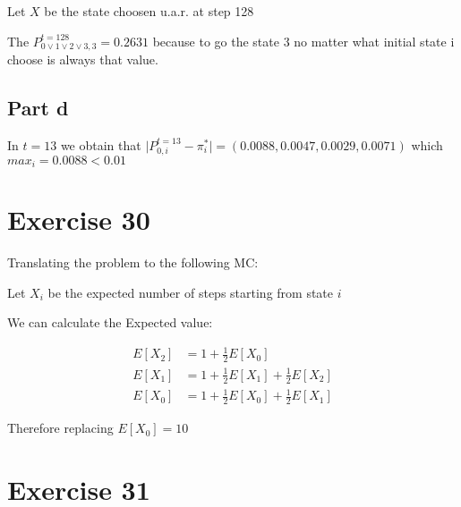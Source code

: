 \documentclass[12pt, a4paper]{article}
\begin{document}
Let $X$ be the state choosen u.a.r. at step 128

The $P_{0 \lor 1 \lor 2 \lor 3, 3}^{t=128} = 0.2631$ because to go the state $3$
no matter what initial state i choose is always that value.

\subsection{Part d}
In $t = 13$ we obtain that $\mid P_{0,i}^{t=13} - \pi_{i}^{*} \mid =
(0.0088,0.0047,0.0029,0.0071)$ which $max_i = 0.0088 < 0.01$

\section{Exercise 30}

Translating the problem to the following MC:


Let $X_i$ be the expected number of steps starting from state $i$

We can calculate the Expected value:

\begin{align*}
  E[X_2] &= 1 + \frac{1}{2}E[X_0]\\
  E[X_1] &= 1 + \frac{1}{2}E[X_1] + \frac{1}{2}E[X_2]\\
  E[X_0] &= 1 + \frac{1}{2}E[X_0] + \frac{1}{2}E[X_1]
\end{align*}

Therefore replacing $E[X_0] = 10$

\section{Exercise 31}
\end{document}
